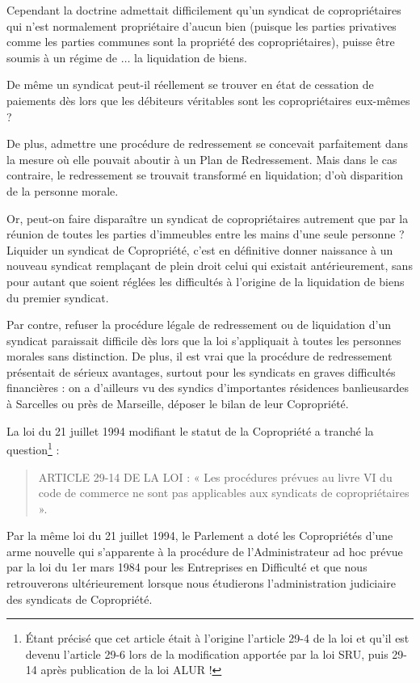 			Cependant la doctrine admettait difficilement qu'un syndicat de copropriétaires qui n'est normalement propriétaire d'aucun bien (puisque les parties privatives comme les parties communes sont la propriété des copropriétaires), puisse être soumis à un régime de $\dots$ la liquidation de biens.
			
			De même un syndicat peut-il réellement se trouver en état de cessation de paiements dès lors que les débiteurs véritables sont les copropriétaires eux-mêmes ?
			
			De plus, admettre une procédure de redressement se concevait parfaitement dans la mesure où elle pouvait aboutir à un Plan de Redressement. Mais dans le cas contraire, le redressement se trouvait transformé en liquidation; d'où disparition de la personne morale.
			
			Or, peut-on faire disparaître un syndicat de copropriétaires autrement que par la réunion de toutes les parties d’immeubles entre les mains d'une seule personne ? Liquider un syndicat de Copropriété, c'est en définitive donner naissance à un nouveau syndicat remplaçant de plein droit celui qui existait antérieurement, sans pour autant que soient réglées les difficultés à l'origine de la liquidation de biens du premier syndicat.
			
			Par contre, refuser la procédure légale de redressement ou de liquidation d'un syndicat paraissait difficile dès lors que la loi s'appliquait à toutes les personnes morales sans distinction. De plus, il est vrai que la procédure de redressement présentait de sérieux avantages, surtout pour les syndicats en graves difficultés financières : on a d'ailleurs vu des syndics d'importantes résidences banlieusardes à Sarcelles ou près de Marseille, déposer le bilan de leur Copropriété.
			
			La loi du 21 juillet 1994 modifiant le statut de la Copropriété a tranché la question\footnote{Étant précisé que cet article était à l’origine l’article 29-4 de la loi et qu’il est devenu l’article 29-6 lors de la modification apportée par la loi SRU, puis 29-14 après publication de la loi ALUR !} :
			\begin{quote}
				ARTICLE 29-14 DE LA LOI : « Les procédures prévues au livre VI du code de commerce ne sont pas applicables aux syndicats de copropriétaires ».
			\end{quote}
			
			Par la même loi du 21 juillet 1994, le Parlement a doté les Copropriétés d'une arme nouvelle qui s'apparente à la procédure de l'Administrateur ad hoc prévue par la loi du 1er mars 1984 pour les Entreprises en Difficulté et que nous retrouverons ultérieurement lorsque nous étudierons l'administration judiciaire des syndicats de Copropriété.

